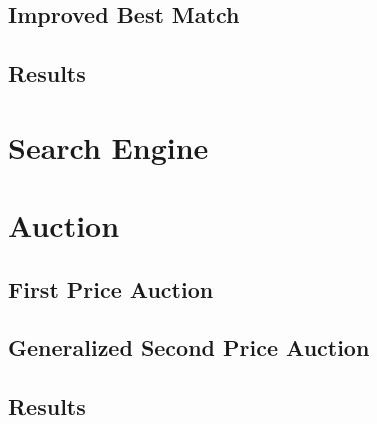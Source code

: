\documentclass{beamer}
\begin{document}
\subsection{Improved Best Match}
\begin{frame}

\end{frame}

\subsection{Results}
\begin{frame}

\end{frame}

\section{Search Engine}
\begin{frame}

\end{frame}

\section{Auction}

\subsection{First Price Auction}
\begin{frame}

\end{frame}

\subsection{Generalized Second Price Auction}
\begin{frame}

\end{frame}

\subsection{Results}
\begin{frame}

\end{frame}
\end{document}
